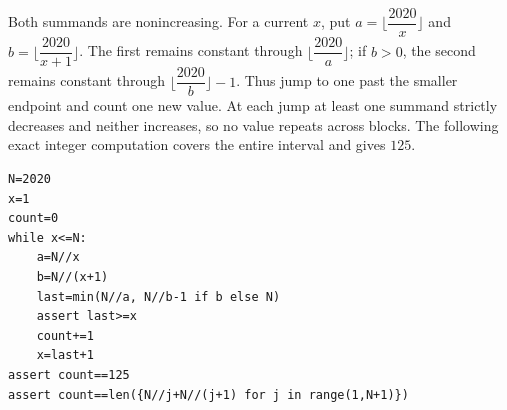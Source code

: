 Both summands are nonincreasing. For a current $x$, put $a=\lfloor\dfrac{2020}{x}\rfloor$ and $b=\lfloor\dfrac{2020}{x+1}\rfloor$. The first remains constant through $\lfloor\dfrac{2020}{a}\rfloor$; if $b>0$, the second remains constant through $\lfloor\dfrac{2020}{b}\rfloor-1$. Thus jump to one past the smaller endpoint and count one new value. At each jump at least one summand strictly decreases and neither increases, so no value repeats across blocks. The following exact integer computation covers the entire interval and gives $\boxed{125}$.
\begin{verbatim}
N=2020
x=1
count=0
while x<=N:
    a=N//x
    b=N//(x+1)
    last=min(N//a, N//b-1 if b else N)
    assert last>=x
    count+=1
    x=last+1
assert count==125
assert count==len({N//j+N//(j+1) for j in range(1,N+1)})
\end{verbatim}
